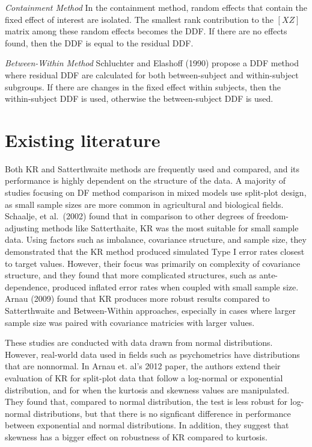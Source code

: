 \documentclass[12pt, twoside]{amherstthesis}
\begin{document}
\emph{Containment Method}
In the containment method, random effects that contain the fixed effect of interest are isolated. The smallest rank contribution to the \([X Z]\) matrix among these random effects becomes the DDF. If there are no effects found, then the DDF is equal to the residual DDF.

\emph{Between-Within Method}
Schluchter and Elashoff (1990) propose a DDF method where residual DDF are calculated for both between-subject and within-subject subgroups. If there are changes in the fixed effect within subjects, then the within-subject DDF is used, otherwise the between-subject DDF is used.

\hypertarget{existing-literature}{%
\section{Existing literature}\label{existing-literature}}

Both KR and Satterthwaite methods are frequently used and compared, and its performance is highly dependent on the structure of the data.
A majority of studies focusing on DF method comparison in mixed models use split-plot design, as small sample sizes are more common in agricultural and biological fields. Schaalje, et al.~(2002) found that in comparison to other degrees of freedom-adjusting methods like Satterthaite, KR was the most suitable for small sample data. Using factors such as imbalance, covariance structure, and sample size, they demonstrated that the KR method produced simulated Type I error rates closest to target values. However, their focus was primarily on complexity of covariance structure, and they found that more complicated structures, such as ante-dependence, produced inflated error rates when coupled with small sample size. Arnau (2009) found that KR produces more robust results compared to Satterthwaite and Between-Within approaches, especially in cases where larger sample size was paired with covariance matricies with larger values.

These studies are conducted with data drawn from normal distributions. However, real-world data used in fields such as psychometrics have distributions that are nonnormal. In Arnau et. al's 2012 paper, the authors extend their evaluation of KR for split-plot data that follow a log-normal or exponential distribution, and for when the kurtosis and skewness values are manipulated. They found that, compared to normal distribution, the test is less robust for log-normal distributions, but that there is no signficant difference in performance between exponential and normal distributions. In addition, they suggest that skewness has a bigger effect on robustness of KR compared to kurtosis.
\end{document}
